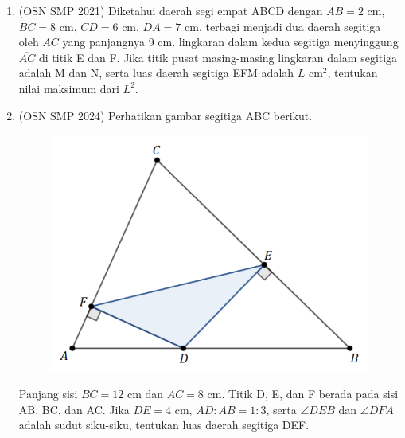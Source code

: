 \documentclass[12pt]{article}
\begin{document}
\begin{CJK*}{UTF8}{min}
\begin{enumerate}
    \item (OSN SMP 2021) Diketahui daerah segi empat ABCD dengan $AB=2$ cm, $BC=8$ cm, $CD=6$ cm, $DA=7$ cm, terbagi menjadi dua daerah segitiga oleh $\overline{AC}$ yang panjangnya 9 cm. lingkaran dalam kedua segitiga menyinggung $\overline{AC}$ di titik E dan F. Jika titik pusat masing-masing lingkaran dalam segitiga adalah M dan N, serta luas daerah segitiga EFM adalah $L \text{ cm}^{2}$, tentukan nilai maksimum dari $L^{2}$.



    \item (OSN SMP 2024) Perhatikan gambar segitiga ABC berikut.
    \begin{figure}[H]
    \centering
    \includegraphics[scale=0.5]{0Figure/osn-smp-2024-3.png}
    \end{figure}
    Panjang sisi $BC=12$ cm dan $AC=8$ cm. Titik D, E, dan F berada pada sisi AB, BC, dan AC. Jika $DE=4$ cm, $AD:AB=1:3$, serta $\angle DEB$ dan $\angle DFA$ adalah sudut siku-siku, tentukan luas daerah segitiga DEF.


\end{enumerate}
\end{CJK*}
\end{document}
